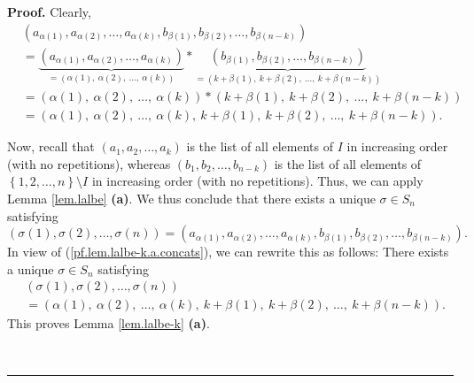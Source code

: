 \documentclass
[numbers=enddot,12pt,final,onecolumn,notitlepage,english]{scrartcl}%
\theoremstyle{definition}
\newenvironment{proof}[1][Proof]{\noindent\textbf{#1.} }{\ \rule{0.5em}{0.5em}}
\newenvironment{verlong}{}{}
\begin{document}
\begin{verlong}
\begin{proof}
Clearly,%
\begin{align}
&  \left(  a_{\alpha\left(  1\right)  },a_{\alpha\left(  2\right)  }%
,\ldots,a_{\alpha\left(  k\right)  },b_{\beta\left(  1\right)  }%
,b_{\beta\left(  2\right)  },\ldots,b_{\beta\left(  n-k\right)  }\right)
\nonumber\\
&  =\underbrace{\left(  a_{\alpha\left(  1\right)  },a_{\alpha\left(
2\right)  },\ldots,a_{\alpha\left(  k\right)  }\right)  }_{=\left(
\alpha\left(  1\right)  ,\ \alpha\left(  2\right)  ,\ \ldots,\ \alpha\left(
k\right)  \right)  }\ast\underbrace{\left(  b_{\beta\left(  1\right)
},b_{\beta\left(  2\right)  },\ldots,b_{\beta\left(  n-k\right)  }\right)
}_{=\left(  k+\beta\left(  1\right)  ,\ k+\beta\left(  2\right)
,\ \ldots,\ k+\beta\left(  n-k\right)  \right)  }\nonumber\\
&  =\left(  \alpha\left(  1\right)  ,\ \alpha\left(  2\right)  ,\ \ldots
,\ \alpha\left(  k\right)  \right)  \ast\left(  k+\beta\left(  1\right)
,\ k+\beta\left(  2\right)  ,\ \ldots,\ k+\beta\left(  n-k\right)  \right)
\nonumber\\
&  =\left(  \alpha\left(  1\right)  ,\ \alpha\left(  2\right)  ,\ \ldots
,\ \alpha\left(  k\right)  ,\ k+\beta\left(  1\right)  ,\ k+\beta\left(
2\right)  ,\ \ldots,\ k+\beta\left(  n-k\right)  \right)  .
\label{pf.lem.lalbe-k.a.concats}%
\end{align}


Now, recall that $\left(  a_{1},a_{2},\ldots,a_{k}\right)  $ is the list of
all elements of $I$ in increasing order (with no repetitions), whereas
$\left(  b_{1},b_{2},\ldots,b_{n-k}\right)  $ is the list of all elements of
$\left\{  1,2,\ldots,n\right\}  \setminus I$ in increasing order (with no
repetitions). Thus, we can apply Lemma \ref{lem.lalbe} \textbf{(a)}. We thus
conclude that there exists a unique $\sigma\in S_{n}$ satisfying%
\[
\left(  \sigma\left(  1\right)  ,\sigma\left(  2\right)  ,\ldots,\sigma\left(
n\right)  \right)  =\left(  a_{\alpha\left(  1\right)  },a_{\alpha\left(
2\right)  },\ldots,a_{\alpha\left(  k\right)  },b_{\beta\left(  1\right)
},b_{\beta\left(  2\right)  },\ldots,b_{\beta\left(  n-k\right)  }\right)  .
\]
In view of (\ref{pf.lem.lalbe-k.a.concats}), we can rewrite this as follows:
There exists a unique $\sigma\in S_{n}$ satisfying%
\begin{align*}
&  \left(  \sigma\left(  1\right)  ,\sigma\left(  2\right)  ,\ldots
,\sigma\left(  n\right)  \right) \\
&  =\left(  \alpha\left(  1\right)  ,\ \alpha\left(  2\right)  ,\ \ldots
,\ \alpha\left(  k\right)  ,\ k+\beta\left(  1\right)  ,\ k+\beta\left(
2\right)  ,\ \ldots,\ k+\beta\left(  n-k\right)  \right)  .
\end{align*}
This proves Lemma \ref{lem.lalbe-k} \textbf{(a)}. \medskip


\end{proof}
\end{verlong}
\end{document}
